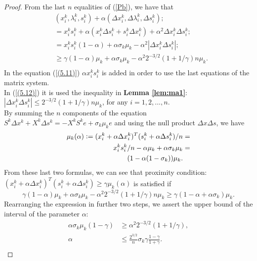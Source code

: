 \documentclass[a4paper,10 pt,titlepage,twoside]{book}
\theoremstyle{plain}
\theoremstyle{definition}
\theoremstyle{remark}
\begin{document}
\begin{proof}
	From the last $n$ equalities of (\ref{Pb}), we have that 
	\begin{align}&(x_{i}^{k}, \lambda_{i}^{k}, s_{i}^{k})+\alpha(\Delta x_{i}^{k},\Delta \lambda_{i}^{k},\Delta s_{i}^{k});\\ 
	 &=x_{i}^{k}s_{i}^{k} + \alpha(x_{i}^{k} \Delta s_{i}^{k} + s_{i}^{k} \Delta x_{i}^{k})+\alpha^{2}\Delta x_{i}^{k} \Delta s_{i}^{k}; \\
	&=x_{i}^{k}s_{i}^{k}(1 - \alpha) + \alpha \sigma_{k}\mu_{k}-\alpha^{2}|\Delta x_{i}^{k} \Delta s_{i}^{k}| \label{(5.11)};\\
	&\geq \gamma(1 - \alpha)\mu_{k} + \alpha \sigma_{k}\mu_{k}-\alpha^{2}2^{-3/2}(1 + 1/ \gamma)n\mu_{k} \label{(5.12)}.\\
	\end{align}
	In the equation (\ref{(5.11)}) $\alpha x_{i}^{k}s_{i}^{k}$ is added in order to use the last equations of the matrix system.\\ 
	In (\ref{(5.12)}) it is used the inequality in \textbf{Lemma \ref{lem:ma1}}: $|\Delta x_{i}^{k}\Delta s_{i}^{k}|\leq2^{-3/2}(1 + 1/\gamma)n\mu_{k}$, for any $i = 1,2,...,n$. \\
	By summing the $n$ components of the equation $S^{k}\Delta x^{k} + X^{k} \Delta s^{k} = -X^{k}S^{k}e + \sigma_{k} \mu_{k}e$ and using the null product $\Delta x \Delta s$, we have
	\begin{align*}\mu_{k}(\alpha)\vcentcolon=(x_{i}^{k} + \alpha\Delta x_{i}^{k})^{T}(s_{i}^{k} + \alpha\Delta s_{i}^{k})/n&=\\ 
	x_{i}^{k}s_{i}^{k}/n - \alpha \mu_{k}+\alpha \sigma_{k} \mu_{k} &=\\
	(1-\alpha(1-\sigma_{k}))\mu_{k}.
	\end{align*}
	From these last two formulas, we can see that proximity condition:\\$(x_{i}^{k} + \alpha\Delta x_{i}^{k})^{T}(s_{i}^{k} + \alpha\Delta s_{i}^{k}) \geq \gamma\mu_{k}(\alpha)$ is satisfied if \begin{equation*}
	\gamma(1-\alpha)\mu_{k} + \alpha\sigma_{k}\mu_{k} - \alpha^{2}2^{-3/2}(1 + 1/\gamma)n\mu_{k}\geq \gamma(1 - \alpha +\alpha\sigma_{k})\mu_{k}.
	\end{equation*}
	Rearranging the expression in further two steps, we assert the upper bound of the interval of the parameter $\alpha$:
	\begin{align*}
	\alpha\sigma_{k}\mu_{k}(1-\gamma)&\geq\alpha^{2}2^{-3/2}(1+1/\gamma),\\
	\alpha&\leq \frac{2^{3/2}}{n} \sigma_{k}\gamma\frac{1-\gamma}{1+\gamma}.\\		

\end{align*}
\end{proof}
\end{document}
